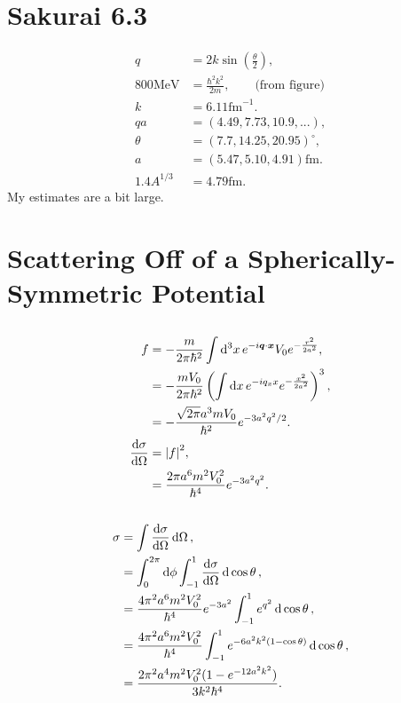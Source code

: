 \documentclass[
a4paper,
10pt,
twoside,
]{article}
\begin{document}
{}
\maketitle
\startmcols

\section{Sakurai 6.3}\label{sec: I}

\begin{align}
	q &= 2k\sin(\frac{\theta}{2}),\\
	800\text{MeV} &= \frac{\hbar^2k^2}{2m},\qquad\text{(from figure)}\\
	k &= 6.11\text{fm}^{-1}.\\
	qa &= (4.49,7.73,10.9,...),\\
	\theta &= (7.7,14.25,20.95)^\circ,\\
	a &= (5.47, 5.10, 4.91)\text{fm}.\\
	1.4 A^{1/3} &= 4.79\text{fm}.
\end{align}
My estimates are a bit large.

\section{Scattering Off of a Spherically-Symmetric Potential}\label{sec: II}
\subsection{}\label{ssec: IIa}

\begin{align}
	f
		&= -\frac{m}{2\pi\hbar^2}\int\dd[3]{x} e^{-i \bm{q}\cdot \bm{x}}V_0 e^{-\frac{r^2}{2a^2}},\\
		&= -\frac{m V_0}{2\pi\hbar^2}\left(\int\dd{x} e^{-i q_x x}e^{-\frac{x^2}{2a^2}}\right)^3,\\
		&= -\frac{\sqrt{2\pi} a^3 m V_0}{\hbar^2}  e^{-3a^2 q^2/2}.\\
	\dv{\sigma}{\Omega}
		&= \abs{f}^2,\\
		&= \frac{2\pi a^6 m^2 V_0^2}{\hbar^4} e^{-3a^2 q^2}.
\end{align}


\subsection{}\label{ssec: IIb}

\begin{align}
	\sigma
		&= \int \dv{\sigma}{\Omega} \dd{\Omega},\\
		&= \int_0^{2\pi} \dd{\phi} \int_{-1}^{1} \dv{\sigma}{\Omega} \dd{\cos\theta},\\
		&= \frac{4\pi^2 a^6 m^2 V_0^2}{\hbar^4} e^{-3a^2} \int_{-1}^{1} e^{q^2} \dd{\cos\theta},\\
		&= \frac{4\pi^2 a^6 m^2 V_0^2}{\hbar^4} \int_{-1}^{1} e^{-6a^2k^2(1-\cos\theta)} \dd{\cos\theta},\\
		&= \frac{2\pi^2 a^4 m^2 V_0^2(1 - e^{-12 a^2 k^2})}{3 k^2 \hbar^4}.
\end{align}
\end{document}
